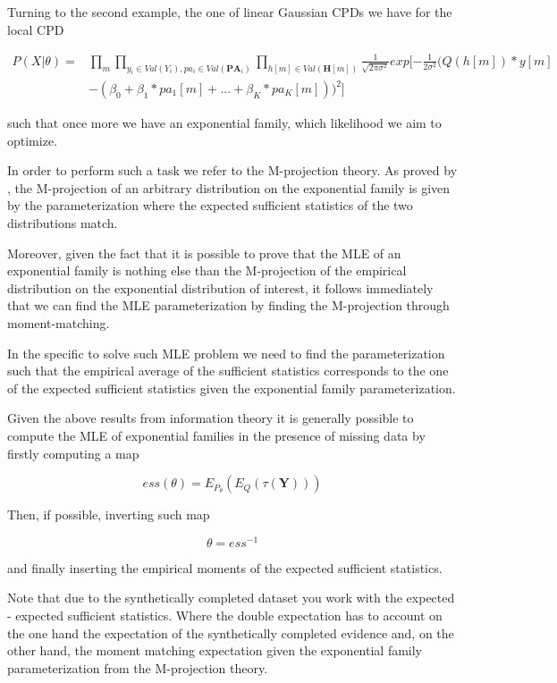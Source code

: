 \documentclass[11pt]{article}
\begin{document}
\begin{article}
Turning to the second example, the one of linear Gaussian CPDs we
have for the local CPD

\begin{align} \label{eq:like-gaussian-cpd}
P(X|\theta) = &\prod_m \prod_{y_i \in Val(Y_i), pa_i \in Val(\textbf{PA}_i)} \prod_{h[m] \in Val(\textbf{H}[m])} \frac{1}{\sqrt{2\pi\sigma^2}} exp[-\frac{1}{2\sigma^2} (Q(h[m]) * y[m]  \\
	    & - (\beta_0 + \beta_1 * pa_1[m] + ... + \beta_K * pa_K[m]))^2]  \nonumber
\end{align}

such that once more we have an exponential family, which likelihood
we aim to optimize.

In order to perform such a task we refer to the M-projection
theory. As proved by \cite{koller2009probabilistic}, the M-projection
of an arbitrary distribution on the exponential family is given by the
parameterization where the expected sufficient statistics of the
two distributions match.

Moreover, given the fact that it is possible to prove that the MLE
of an exponential family is nothing else than the M-projection of
the empirical distribution on the exponential distribution of
interest, it follows immediately that we can find the MLE
parameterization by finding the M-projection through
moment-matching.

In the specific to solve such MLE problem we need to find the
parameterization such that the empirical average of the sufficient
statistics corresponds to the one of the expected sufficient
statistics given the exponential family parameterization.

Given the above results from information theory it is generally
possible to compute the MLE of exponential families in the presence
of missing data by firstly computing a map

$$ess(\theta) = E_{P_\theta}(E_Q(\tau(\textbf{Y})))$$

Then, if possible, inverting such map

$$\theta = ess^{-1}$$

and finally inserting the empirical moments of the expected
sufficient statistics.

Note that due to the synthetically completed dataset you work with
the expected - expected sufficient statistics. Where the double
expectation has to account on the one hand the expectation of the
synthetically completed evidence and, on the other hand, the moment
matching expectation given the exponential family parameterization
from the M-projection theory.


\end{article}
\end{document}
